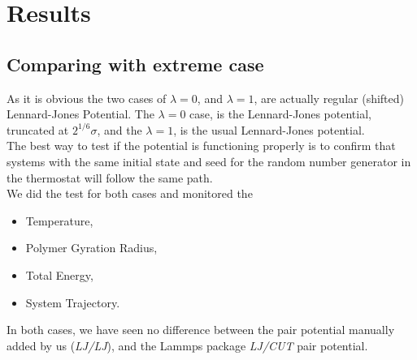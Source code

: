 \section{Results}
\subsection{Comparing with extreme case}
As it is obvious the two cases of $\lambda = 0$, and $\lambda = 1$, are actually regular (shifted) Lennard-Jones Potential. The $\lambda = 0$ case, is the Lennard-Jones potential, truncated at $2^{1/6} \sigma$, and the 
$\lambda = 1$, is the usual Lennard-Jones potential.
\\
The best way to test if the potential is functioning properly is to confirm that systems with the same initial state and seed for the random number generator in the thermostat will follow the same path.
\\
We did the test for both cases and monitored the 
\begin{itemize}
    \item Temperature,
    \item Polymer Gyration Radius,
    \item Total Energy,
    \item System Trajectory.
\end{itemize}
In both cases, we have seen no difference between the pair potential manually added by us (\textit{LJ/LJ}), and the Lammps package \textit{LJ/CUT} pair potential.
